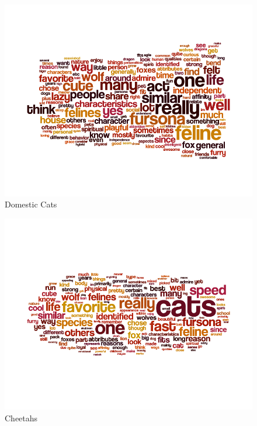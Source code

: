 \begin{figure}
  \begin{center}
    \includegraphics[width=\textwidth]{content/assets/species-2--cat}
  \end{center}
  \caption{Domestic Cats}
\end{figure}

\begin{figure}
  \begin{center}
    \includegraphics[width=\textwidth]{content/assets/species-2--cheetah}
  \end{center}
  \caption{Cheetahs}
\end{figure}

